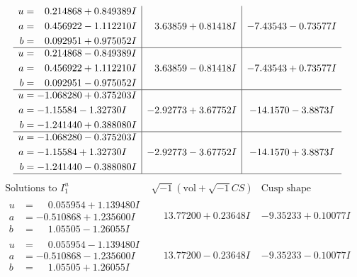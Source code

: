 \documentclass[1p]{elsarticle_modified}
\theoremstyle{definition}
\newcommand{\I}{\sqrt{-1}}
\begin{document}
$$\begin{array}{c|c|c}
\begin{aligned}
u &= \phantom{-}0.214868 + 0.849389 I \\
a &= \phantom{-}0.456922 - 1.112210 I \\
b &= \phantom{-}0.092951 + 0.975052 I\end{aligned}
 & \phantom{-}3.63859 + 0.81418 I & -7.43543 - 0.73577 I \\ \hline\begin{aligned}
u &= \phantom{-}0.214868 - 0.849389 I \\
a &= \phantom{-}0.456922 + 1.112210 I \\
b &= \phantom{-}0.092951 - 0.975052 I\end{aligned}
 & \phantom{-}3.63859 - 0.81418 I & -7.43543 + 0.73577 I \\ \hline\begin{aligned}
u &= -1.068280 + 0.375203 I \\
a &= -1.15584 - 1.32730 I \\
b &= -1.241440 + 0.388080 I\end{aligned}
 & -2.92773 + 3.67752 I & -14.1570 - 3.8873 I \\ \hline\begin{aligned}
u &= -1.068280 - 0.375203 I \\
a &= -1.15584 + 1.32730 I \\
b &= -1.241440 - 0.388080 I\end{aligned}
 & -2.92773 - 3.67752 I & -14.1570 + 3.8873 I\\
 \hline 
 \end{array}$$\newpage$$\begin{array}{c|c|c}  
\text{Solutions to }I^u_{1}& \I (\text{vol} + \sqrt{-1}CS) & \text{Cusp shape}\\
 \hline 
\begin{aligned}
u &= \phantom{-}0.055954 + 1.139480 I \\
a &= -0.510868 + 1.235600 I \\
b &= \phantom{-}1.05505 - 1.26055 I\end{aligned}
 & \phantom{-}13.77200 + 0.23648 I & -9.35233 + 0.10077 I \\ \hline\begin{aligned}
u &= \phantom{-}0.055954 - 1.139480 I \\
a &= -0.510868 - 1.235600 I \\
b &= \phantom{-}1.05505 + 1.26055 I\end{aligned}
 & \phantom{-}13.77200 - 0.23648 I & -9.35233 - 0.10077 I \\ \hline\begin{aligned}

\end{aligned}
\end{array}$$
\end{document}
